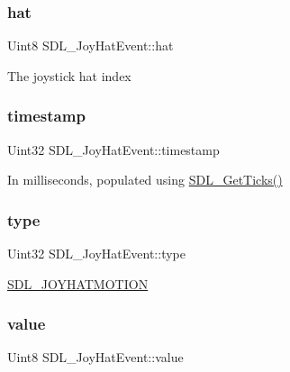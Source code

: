 \subsubsection{\texorpdfstring{hat}{hat}}
{\footnotesize\ttfamily Uint8 S\+D\+L\+\_\+\+Joy\+Hat\+Event\+::hat}

The joystick hat index \mbox{\label{struct_s_d_l___joy_hat_event_ade58ecb3e75aad4ef9809f040519a021}} 
\subsubsection{\texorpdfstring{timestamp}{timestamp}}
{\footnotesize\ttfamily Uint32 S\+D\+L\+\_\+\+Joy\+Hat\+Event\+::timestamp}

In milliseconds, populated using \mbox{\hyperlink{_s_d_l__timer_8h_a0b9bc71d6287e0ffafdc3419760fe2b3}{S\+D\+L\+\_\+\+Get\+Ticks()}} \mbox{\label{struct_s_d_l___joy_hat_event_ac583dafab46c44354e210a542aff57cc}} 
\subsubsection{\texorpdfstring{type}{type}}
{\footnotesize\ttfamily Uint32 S\+D\+L\+\_\+\+Joy\+Hat\+Event\+::type}

\mbox{\hyperlink{_s_d_l__events_8h_a3b589e89be6b35c02e0dd34a55f3fccaafba4080bfbad335e520097b2024f0dff}{S\+D\+L\+\_\+\+J\+O\+Y\+H\+A\+T\+M\+O\+T\+I\+ON}} \mbox{\label{struct_s_d_l___joy_hat_event_a52b179a34407449941b61d988ca72ef4}} 
\subsubsection{\texorpdfstring{value}{value}}
{\footnotesize\ttfamily Uint8 S\+D\+L\+\_\+\+Joy\+Hat\+Event\+::value}

